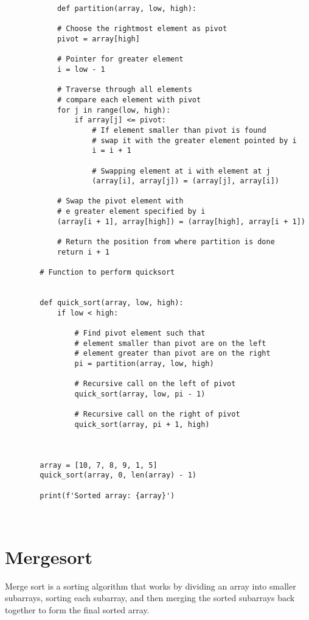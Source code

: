 \begin{verbatim}
            def partition(array, low, high):
         
            # Choose the rightmost element as pivot
            pivot = array[high]
         
            # Pointer for greater element
            i = low - 1
         
            # Traverse through all elements
            # compare each element with pivot
            for j in range(low, high):
                if array[j] <= pivot:
                    # If element smaller than pivot is found
                    # swap it with the greater element pointed by i
                    i = i + 1
         
                    # Swapping element at i with element at j
                    (array[i], array[j]) = (array[j], array[i])
         
            # Swap the pivot element with
            # e greater element specified by i
            (array[i + 1], array[high]) = (array[high], array[i + 1])
         
            # Return the position from where partition is done
            return i + 1
         
        # Function to perform quicksort
         
         
        def quick_sort(array, low, high):
            if low < high:
         
                # Find pivot element such that
                # element smaller than pivot are on the left
                # element greater than pivot are on the right
                pi = partition(array, low, high)
         
                # Recursive call on the left of pivot
                quick_sort(array, low, pi - 1)
         
                # Recursive call on the right of pivot
                quick_sort(array, pi + 1, high)
         
         
        
        array = [10, 7, 8, 9, 1, 5]
        quick_sort(array, 0, len(array) - 1)
         
        print(f'Sorted array: {array}')

\end{verbatim}\\

\section*{Mergesort}
        Merge sort is a sorting algorithm that works by dividing an array into smaller subarrays, sorting each subarray, and then merging the sorted subarrays back together to form the final sorted array.

